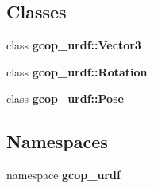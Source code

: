 \subsection*{\-Classes}
\begin{DoxyCompactItemize}
\item 
class {\bf gcop\-\_\-urdf\-::\-Vector3}
\item 
class {\bf gcop\-\_\-urdf\-::\-Rotation}
\item 
class {\bf gcop\-\_\-urdf\-::\-Pose}
\end{DoxyCompactItemize}
\subsection*{\-Namespaces}
\begin{DoxyCompactItemize}
\item 
namespace {\bf gcop\-\_\-urdf}
\end{DoxyCompactItemize}
